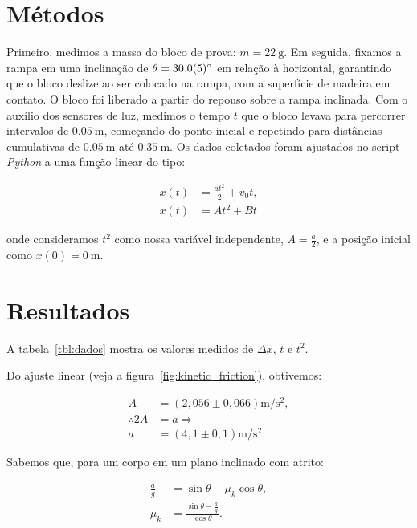 \documentclass[10pt,oneside,twocolumn,a4paper]{article}
\begin{document}
\section{Métodos}

Primeiro, medimos a massa do bloco de prova: $m = \SI{22}{\gram}$. Em seguida,
fixamos a rampa em uma inclinação de $\theta = \SI{30 \pm 0.5}{\degree}$ em
relação à horizontal, garantindo que o bloco deslize ao ser colocado na rampa,
com a superfície de madeira em contato. O bloco foi liberado a partir do
repouso sobre a rampa inclinada. Com o auxílio dos sensores de luz, medimos o
tempo $t$ que o bloco levava para percorrer intervalos de $\SI{0.05}{\metre}$,
começando do ponto inicial e repetindo para distâncias cumulativas de
$\SI{0,05}{\metre}$ até $\SI{0.35}{\metre}$. Os dados coletados foram ajustados
no script \textit{Python} a uma função linear do tipo:

\begin{align*}
	x(t) &= \frac{at^2}{2} + v_0t, \\
	x(t) &= At^2 + Bt
\end{align*}

onde consideramos $t^2$ como nossa variável independente, $A = \frac{a}{2}$, e
a posição inicial como $x(0) = \SI{0}{\meter}$.

\section{Resultados}

A tabela~\ref{tbl:dados} mostra os valores medidos de $\Delta x$, $t$ e
$t^2$.

Do ajuste linear (veja a figura~\ref{fig:kinetic_friction}), obtivemos:

\begin{align}\label{eq:accel}
	A &= \left( 2,056 \pm 0,066 \right) \si{\metre\per\second\squared}, \nonumber \\
	\therefore 2A &= a \Rightarrow \nonumber \\
	a &= \left( 4,1 \pm 0,1 \right) \si{\metre\per\second\squared}.
\end{align}

Sabemos que, para um corpo em um plano inclinado com atrito:

\begin{align}\label{eq:mu}
	\frac{a}{g} &= \sin\theta - \mu_k \cos\theta, \nonumber \\
	\mu_k &= \frac{\sin\theta - \frac{a}{g}}{\cos\theta}.
\end{align}
\end{document}
